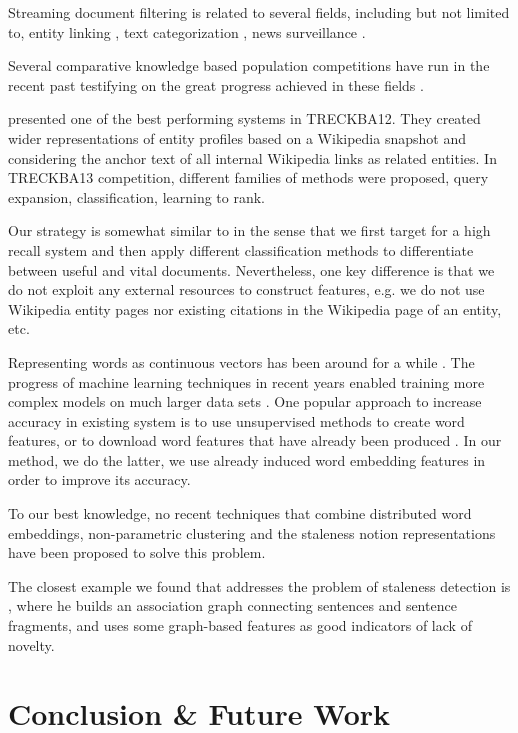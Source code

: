 \documentclass{article}
\begin{document}
Streaming document filtering is related to several fields, including but not limited to, entity linking \cite{KBP11}, text categorization \cite{HLTCOE12}, news surveillance \cite{Steinberger14}.

Several comparative knowledge based population competitions have run in the recent past testifying on the great progress achieved in these fields \cite{gross_doucet_toivonen_trec12}. 

\cite{xitong12} presented one of the best performing systems in TRECKBA12. They created wider representations of entity profiles based on a Wikipedia snapshot and considering the anchor text of all internal Wikipedia links as related entities. In TRECKBA13 competition, different families of methods were proposed, query expansion, classification, learning to rank. 

Our strategy is somewhat similar to \cite{jingang13} in the sense that we first target for a high recall system and then apply different classification methods to differentiate between useful and vital documents. Nevertheless, one key difference is that we do not exploit any external resources to construct features, e.g. we do not use Wikipedia entity pages nor existing citations in the Wikipedia page of an entity, etc. 

Representing words as continuous vectors has been around for a while \cite{Hinton87, Elman90findingstructure}. The progress of machine learning techniques in recent years enabled training more complex models on much larger data sets \cite{mikolovChen}. One popular approach to increase accuracy in existing system is to use unsupervised methods to create word features, or to download word features that have already been produced \cite{Turian10wordrepresentations}. In our method, we do the latter, we use already induced word embedding features in order to improve its accuracy.

To our best knowledge, no recent techniques that combine distributed word embeddings, non-parametric clustering and the staleness notion representations have been proposed to solve this problem.

The closest example we found that addresses the problem of staleness detection is \cite{gamon}, where he builds an association graph connecting sentences and sentence fragments, and uses some graph-based features as good indicators of lack of novelty.

\section{Conclusion \& Future Work}
\label{conclusion}
\end{document}
